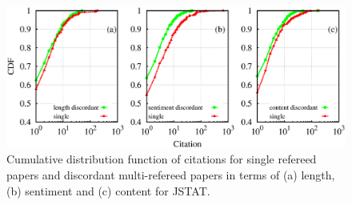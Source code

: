\begin{figure}
 \centering
 \includegraphics[scale = 0.3]{./texfiles/Chapter_4/cikm_17/figures/citation_mul_all_dis.eps}
 \caption{\label{con:citation_dis} Cumulative distribution function of citations for single refereed papers and discordant multi-refereed papers in terms of (a) length, (b) sentiment 
 and (c) content for JSTAT.} 
\vspace{3mm}
 \end{figure}

\medskip
